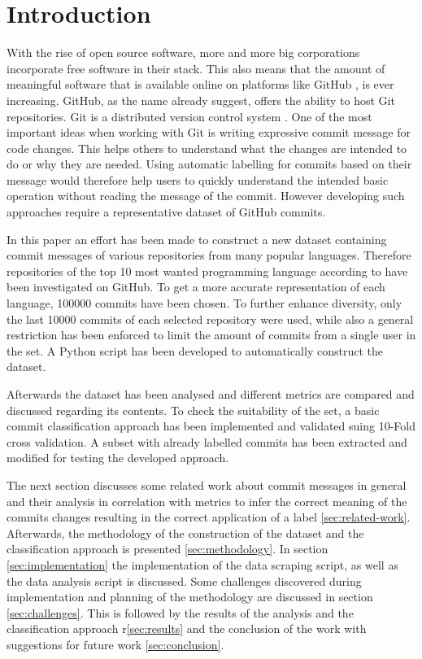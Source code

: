 \section{Introduction}
\label{sec:introduction}

With the rise of open source software, more and more big corporations
incorporate free software in their stack. This also means that the amount of
meaningful software that is available online on platforms like GitHub
\cite{github}, is ever increasing. GitHub, as the name already suggest, offers
the ability to host Git repositories. Git is a distributed version control
system \cite{git}. One of the most important ideas when working with Git
is writing expressive commit message for code changes. This helps others
to understand what the changes are intended to do or why they are needed.
Using automatic labelling for commits based on their message would therefore
help users to quickly understand the intended basic operation without reading
the message of the commit. However developing such approaches require a
representative dataset of GitHub commits.

In this paper an effort has been made to construct a new dataset containing
commit messages of various repositories from many popular languages. Therefore
repositories of the top 10 most wanted programming language according to
\cite{so-survey} have been investigated on GitHub. To get a more accurate
representation of each language, 100000 commits have been chosen. To further
enhance diversity, only the last 10000 commits of each selected repository
were used, while also a general restriction has been enforced to limit the
amount of commits from a single user in the set. A Python script has been
developed to automatically construct the dataset.

Afterwards the dataset has been analysed and different metrics are
compared and discussed regarding its contents. To check the
suitability of the set, a basic commit classification approach has been
implemented and validated suing 10-Fold cross validation. A subset with
already labelled commits has been extracted and modified for testing the
developed approach.

The next section discusses some related work about commit messages in
general and their analysis in correlation with metrics to infer the
correct meaning of the commits changes resulting in the correct application
of a label \ref{sec:related-work}. Afterwards, the methodology of the
construction of the dataset and the classification approach is presented
\ref{sec:methodology}. In section \ref{sec:implementation} the
implementation of the data scraping script, as well as the data analysis
script is discussed. Some challenges discovered during implementation and
planning of the methodology are discussed in section \ref{sec:challenges}.
This is followed by the results of the analysis and
the classification approach r\ref{sec:results} and the conclusion of the
work with suggestions for future work \ref{sec:conclusion}.
